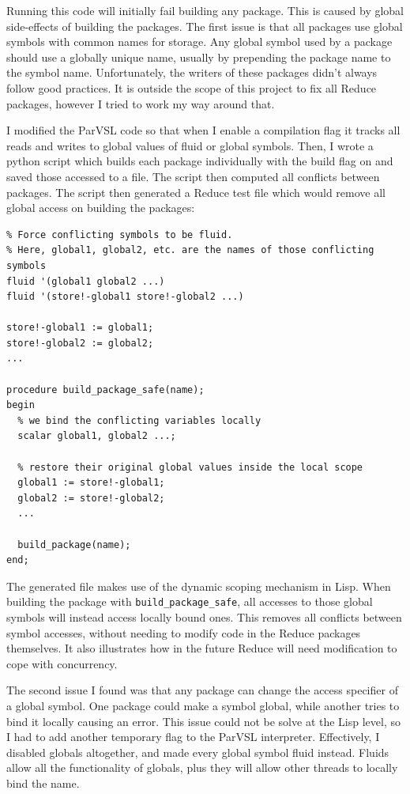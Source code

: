 Running this code will initially fail building any package. This is caused
by global side-effects of building the packages. The first issue is that all
packages use global symbols with common names for storage. Any global
symbol used by a package should use a globally unique name, usually by prepending
the package name to the symbol name. Unfortunately, the writers of these packages
didn't always follow good practices. It is outside the scope of this project to
fix all Reduce packages, however I tried to work my way around that.

I modified the ParVSL code so that when I enable a compilation flag it tracks all
reads and writes to global values of fluid or global symbols. Then, I wrote a python
script which builds each package individually with the build flag on and saved those
accessed to a file. The script then computed all conflicts between packages. The script
then generated a Reduce test file which would remove all global access on building the packages:

\begin{verbatim}
% Force conflicting symbols to be fluid.
% Here, global1, global2, etc. are the names of those conflicting symbols
fluid '(global1 global2 ...)
fluid '(store!-global1 store!-global2 ...)

store!-global1 := global1;
store!-global2 := global2;
...

procedure build_package_safe(name);
begin
  % we bind the conflicting variables locally
  scalar global1, global2 ...;

  % restore their original global values inside the local scope
  global1 := store!-global1;
  global2 := store!-global2;
  ...

  build_package(name);
end;
\end{verbatim}

The generated file makes use of the dynamic scoping mechanism in Lisp. When building the package
with \texttt{build\_package\_safe}, all accesses to those global symbols will instead access locally
bound ones. This removes all conflicts between symbol accesses, without needing to modify code in
the Reduce packages themselves. It also illustrates how in the future Reduce will need modification
to cope with concurrency.

The second issue I found was that any package can change the access specifier of a global symbol.
One package could make a symbol global, while another tries to bind it locally causing an error.
This issue could not be solve at the Lisp level, so I had to add another temporary flag to the
ParVSL interpreter. Effectively, I disabled globals altogether, and made every global symbol
fluid instead. Fluids allow all the functionality of globals, plus they will allow other threads
to locally bind the name.

